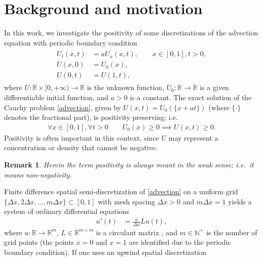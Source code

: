 \documentclass[a4paper]{article}
\newtheorem{remark}{Remark}
\newcommand{\dx}{\Delta x}
\begin{document}
\section{Background and motivation}
In this work, we investigate the positivity of some discretizations of the advection equation
with periodic boundary condition
\begin{align}\label{advection}
\begin{split}
	U_t (x,t) &= a U_x(x,t), \qquad x\in[0,1], t>0, \\
	U(x,0) &= U_0(x), \\
	U(0,t) &= U(1,t),
\end{split}
\end{align}
where $U:\mathbb{R}\times [0,+\infty)\to\mathbb{R}$ is the unknown function, $U_0:\mathbb{R}\to\mathbb{R}$ is a given differentiable initial function, and $a>0$ is a constant. 
The exact solution of the Cauchy problem \eqref{advection}, given by $U(x,t) =
U_0(\{x+a t\})$ (where $\{\cdot\}$ denotes the fractional part), is positivity preserving; i.e.
\begin{align} \label{implies-positivity}
\forall x\in[0,1], \forall t>0\quad\quad U_0(x) \ge 0 \implies U(x,t) \ge 0.
\end{align}
Positivity is often important in this context, since $U$ may represent a
concentration or density that cannot be negative.

\begin{remark}
Herein the term {\emph{positivity}} is always meant in the weak sense;
i.e.~it means {\emph{non-negativity}}. 
\end{remark}



Finite difference spatial semi-discretization of \eqref{advection} on a uniform grid $\{\dx,2\dx,\ldots, m\dx\}\subset [0,1]$ 
with mesh spacing $\dx>0$ and $m\dx=1$ yields a system of ordinary differential equations
\begin{align} \label{semi-discrete}
    u'(t) & = \frac{a}{\dx}Lu(t),
\end{align}
where $u:\mathbb{R}\to\mathbb{R}^m$, $L\in\mathbb{R}^{m\times m}$ is a circulant matrix  \cite[Section 5.16]{matmat}, and $m \in\mathbb{N}^+$ is the number of grid points (the points $x=0$ and $x=1$ are identified due to the periodic boundary condition).
If one uses an upwind spatial discretization
\end{document}
